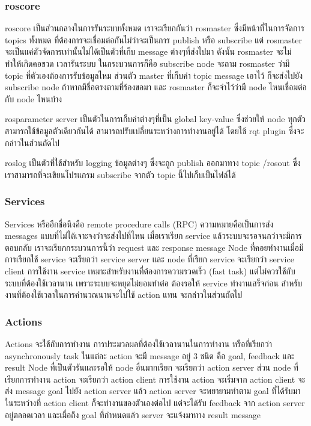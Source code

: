 \subsubsection*{roscore}
roscore เป็นส่วนกลางในการรันระบบทั้งหมด เราจะเรียกกันว่า rosmaster ซึ่งมีหน้าที่ในการจัดการ
topics ทั้งหมด ที่ต้องการจะเชื่อมต่อกันไม่ว่าจะเป็นการ publish หรือ subscribe แต่ rosmaster
จะเป็นแค่ตัวจัดการเท่านั้นไม่ได้เป็นตัวที่เก็บ message ต่างๆที่ส่งไปมา ดังนั้น rosmaster จะไม่ทำให้เกิดคอขวด เวลารันระบบ
ในกระบวนการก็คือ subscribe node จะถาม rosmaster ว่ามี topic ที่ตัวเองต้องการรับข้อมูลไหม
ส่วนตัว master ที่เก็บค่า topic message เอาไว้ ก็จะส่งไปยัง subscribe node ถ้าหากมีชื่อตรงตามที่ร้องขอมา
และ rosmaster ก็จะจำไว้ว่ามี node ไหนเชื่อมต่อกับ node ไหนบ้าง

rosparameter server เป็นตัวในการเก็บค่าต่างๆที่เป็น global key-value ซึ่งช่วยให้ node ทุกตัวสามารถใช้ข้อมูลตัวเดียวกันได้
สามารถปรับเปลี่ยนระหว่างการทำงานอยู่ได้ โดยใช้ rqt plugin ซึ่งจะกล่าวในส่วนถัดไป

roslog เป็นตัวที่ใช้สำหรับ logging ข้อมูลต่างๆ ซึ่งจะถูก publish ออกมาทาง topic /rosout ซึ่งเราสามารถที่จะเขียนโปรแกรม
subscribe จากตัว topic นี้ไปเก็บเป็นไฟล์ได้

\subsubsection*{Services}
Services หรืออีกชื่อนึงคือ remote procedure calls (RPC) ความหมายคือเป็นการส่ง messages แบบที่ไม่ได้เจาะจงว่าจะส่งไปที่ไหน
เมื่อเราเรียก service แล้วระบบจะรอจนกว่าจะมีการตอบกลับ เราจะเรียกกระบวนการนี้ว่า request และ response message
Node ที่คอยทำงานเมื่อมีการเรียกใช้ service จะเรียกว่า service server และ node ที่เรียก service จะเรียกว่า service client
การใช้งาน service เหมาะสำหรับงานที่ต้องการความรวดเร็ว (fast task) แต่ไม่ควรใช้กับระบบที่ต้องใช้เวลานาน
เพราะระบบจะหยุดไม่ยอมทำต่อ ต้องรอให้ service ทำงานเสร็จก่อน สำหรับงานที่ต้องใช้เวลาในการคำนวณนานจะไปใช้ action
แทน จะกล่าวในส่วนถัดไป 


\subsubsection*{Actions}
Actions จะใช้กับการทำงาน การประมวลผลที่ต้องใช้เวลานานในการทำงาน หรือที่เรียกว่า asynchronously task
ในแต่ละ action จะมี message อยู่ 3 ชนิด คือ goal, feedback และ result Node ที่เป็นตัวรันและรอให้ node อื่นมากเรียก
จะเรียกว่า action server ส่วน node ที่เรียกการทำงาน action จะเรียกว่า action client การใช้งาน action จะเริ่มจาก
action client จะส่ง message goal ไปยัง action server แล้ว action server จะพยายามทำตาม goal ที่ได้รับมา ในระหว่างที่
action client ก็จะทำงานของตัวเองต่อไป แต่จะได้รับ feedback จาก action server อยู่ตลอดเวลา และเมื่อถึง goal ที่กำหนดแล้ว
server จะแจ้งมาทาง result message

